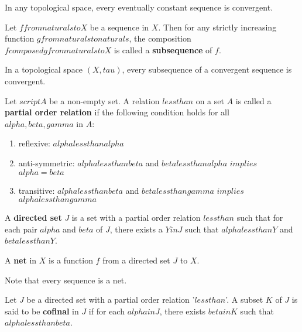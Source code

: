 \begin{thm}
    In any topological space, every eventually constant sequence is convergent.
\end{thm}

\begin{defn}
    Let $f from naturals to X$ be a sequence in $X$. Then for any strictly increasing function $g from naturals to naturals$, the composition $f composed g from naturals to X$ is called a \textbf{subsequence} of $f$.
\end{defn}

\begin{thm}
    In a topological space $(X, tau)$, every subsequence of a convergent sequence is convergent.
\end{thm}

\begin{defn}
    Let $script A$ be a non-empty set. A relation $less than$ on a set $A$ is called a \textbf{partial order relation} if the following condition holds for all $alpha, beta, gamma$ in $A$:
    \begin{enumerate}
        \item reflexive: $alpha less than alpha$
        \item anti-symmetric: $alpha less than beta$ and $beta less than alpha$ $implies$ $alpha = beta$
        \item transitive: $alpha less than beta$ and $beta less than gamma$ $implies$ $alpha less than gamma$
    \end{enumerate}
\end{defn}

\begin{defn}
    A \textbf{directed set} $J$ is a set with a partial order relation $less than$ such that for each pair $alpha$ and $beta$ of $J$, there exists a $Y in J$ such that $alpha less than Y$ and $beta less than Y$.
\end{defn}

\begin{defn}
    A \textbf{net} in $X$ is a function $f$ from a directed set $J$ to $X$.
\end{defn}

Note that every sequence is a net.

\begin{defn}
    Let $J$ be a directed set with a partial order relation '$less than$'. A subset $K$ of $J$ is said to be \textbf{cofinal} in $J$ if for each $alpha in J$, there exists $beta in K$ such that $alpha less than beta$.
\end{defn}

